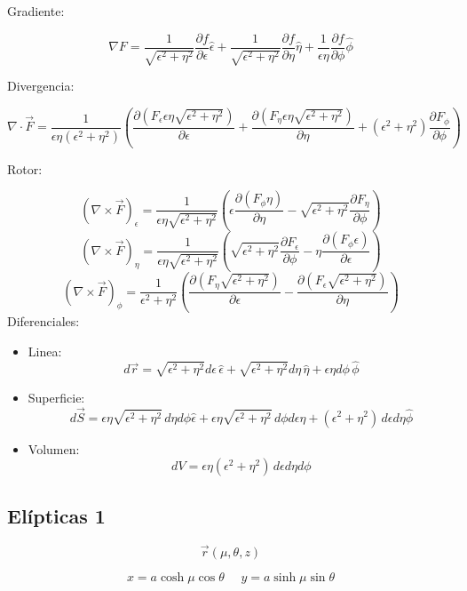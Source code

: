 \bigbreak

Gradiente:

\[\nabla F = \frac{1}{\sqrt{\epsilon^2+\eta^2}}\frac{\partial
 f}{\partial \epsilon}\hat{\epsilon}+\frac{1}{\sqrt{\epsilon^2+\eta^2}}\frac{\partial
 f}{\partial \eta}\hat{\eta}+\frac{1}{\epsilon\eta}\frac{\partial f}{\partial \phi}\hat{\phi}\]

Divergencia:

\[\nabla \cdot \vec{F} = \frac{1}{\epsilon\eta(\epsilon^2+\eta^2)}
\left(
\frac{\partial(F_\epsilon\epsilon\eta\sqrt{\epsilon^2+\eta^2})}{\partial\epsilon}+
\frac{\partial(F_\eta\epsilon\eta\sqrt{\epsilon^2+\eta^2})}{\partial\eta}+(\epsilon^2+\eta^2)
\frac{\partial F_\phi}{\partial\phi}\right)\]

Rotor:

\[\left(\nabla\times\vec{F}\right)_\epsilon =
\frac{1}{\epsilon\eta\sqrt{\epsilon^2+\eta^2}}
\left(\epsilon
\frac{\partial(F_\phi\eta)}{\partial\eta}-\sqrt{\epsilon^2+\eta^2}\frac{\partial F_\eta}{\partial\phi}\right)\]
\[\left(\nabla\times\vec{F}\right)_\eta=\frac{1}{\epsilon\eta\sqrt{\epsilon^2+\eta^2}}
\left(\sqrt{\epsilon^2+\eta^2}
\frac{\partial F_\epsilon}{\partial\phi}-\eta
\frac{\partial(F_\phi\epsilon)}{\partial\epsilon}\right)\]
\[\left(\nabla\times\vec{F}\right)_\phi=
\frac{1}{\epsilon^2+\eta^2}
\left(\frac{\partial(F_\eta\sqrt{\epsilon^2+\eta^2})}{\partial\epsilon}-\frac{\partial(F_\epsilon\sqrt{\epsilon^2+\eta^2})}{\partial\eta}\right)\]
\newpage
Diferenciales:

\begin{itemize}
    \item Linea:
    \[d\vec{r} = \sqrt{\epsilon^2+\eta^2}d\epsilon\,\hat{\epsilon} + \sqrt{\epsilon^2+\eta^2}d\eta\,\hat{\eta}+\epsilon\eta d\phi\,\hat{\phi}\]
    \item Superficie:
    \[d\vec{S} = \epsilon\eta\sqrt{\epsilon^2+\eta^2}\,d\eta d\phi\hat{\epsilon}+\epsilon\eta\sqrt{\epsilon^2+\eta^2}\,d\phi d\epsilon\hat{\eta}+(\epsilon^2+\eta^2)\,d\epsilon d\eta\hat{\phi}\]
    \item Volumen:
    \[dV = \epsilon\eta(\epsilon^2+\eta^2)\,d\epsilon d\eta d\phi\]
\end{itemize}

\subsection{Elípticas 1}

\[\Vec{r}(\mu,\theta,z)\]

\begin{minipage}{0.55\textwidth}
\begin{equation}
    x = a\cosh{\mu}\cos{\theta}\,\,\,\,\,\,\,\,
    y = a\sinh{\mu}\sin{\theta}
\nonumber
\end{equation}
\end{minipage}

